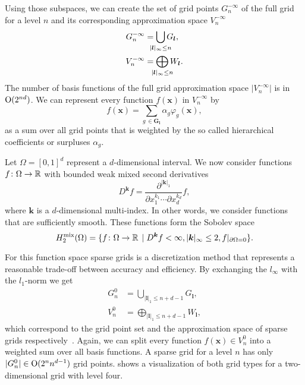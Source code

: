 Using those subspaces, we can create the set of grid points \(G_n^{-\infty}\) of the full grid for a level \(n\) and its corresponding approximation space \(V_n^{-\infty}\)
\begin{align*}
  G_n^{-\infty} &= \bigcup_{\mathclap{\vert {\bm{l}} \vert_\infty \leq n}} G_{\bm{l}}, \\
  V_n^{-\infty} &= \bigoplus_{\mathclap{\vert {\bm{l}} \vert_\infty \leq n}} W_{\bm{l}}.
\end{align*}
The number of basis functions of the full grid approximation space \(\vert V_n^{-\infty} \vert\) is in \( \operatorname{O} (2^{nd})\).
We can represent every function \(f(\bm{x})\) in \(V_n^{-\infty}\) by
\begin{equation}\label{eq:coefficients-h2mix}
  f(\bm{x}) = \sum_{g\, \in \bm{G_l}} \alpha_{g} \varphi_{g}(\bm{x}),
\end{equation}
as a sum over all grid points that is weighted by the so called hierarchical coefficients or surpluses \(\alpha_{g}\).

Let \(\Omega = [0, 1]^d\) represent a \(d\)-dimensional interval. 
We now consider functions \({f \colon \Omega \to \mathbb{R}}\) with bounded weak
mixed second derivatives
\begin{equation*}
  D^{\bm{k}} f = \frac{\partial^{\vert \bm{k} \vert_1 }}{\partial x^{k_1}_1 \cdots \partial x^{k_d}_d} f,
\end{equation*}
where \(\bm{k}\) is a \(d\)-dimensional multi-index.
In other words, we consider functions that are sufficiently smooth.
These functions form the Sobolev space~\cite{sparse-parsimony}
\begin{equation*}
  H_2^\text{mix}(\Omega) = \{ f \colon \Omega \to \mathbb{R} \, \mid  D^{\bm{k}} f < \infty, \vert \bm{k} \vert_\infty \leq 2, f \rvert_{\partial \Omega = 0}\}.
\end{equation*}

For this function space sparse grids is a discretization method that represents a reasonable trade-off between accuracy and efficiency.
By exchanging the \(l_\infty\) with the \(l_1\)-norm we get
\begin{align}
  G_n^0 &= \bigcup_{\vert {\bm{l}} \vert_1 \leq n + d - 1} G_{\bm{l}}, \nonumber \\
  V_n^0 &= \bigoplus_{\vert {\bm{l}} \vert_1 \leq n + d - 1} W_{\bm{l}} \label{eq:sparse-grid-space},
\end{align}
which correspond to the grid point set and the approximation space of sparse
grids respectively~\cite{bungartzSparse}.
Again, we can split every function \(f(\bm{x}) \in V_n^0\) into a weighted sum
over all basis functions.
A sparse grid for a level \(n\) has only \(\vert G_n^0 \vert \in \operatorname{O} (2^n
n^{d-1})\) grid points.
 shows a visualization of both grid types for a
two-dimensional grid with level four.


